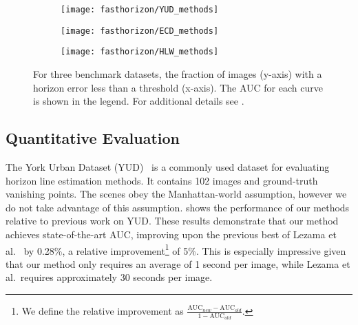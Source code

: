 \begin{figure*}[]
  \centering
  \begin{subfigure}{.30\linewidth}
    \centering
    \texttt{[image: fasthorizon/YUD\_methods]}
    \label{fig:horError_YUD}
  \end{subfigure}
  \hfill
  \begin{subfigure}{.3\linewidth}
    \centering
    \texttt{[image: fasthorizon/ECD\_methods]}
    \label{fig:horError_ECD}
  \end{subfigure}
  \hfill
  \begin{subfigure}{.3\linewidth}
    \centering
    \texttt{[image: fasthorizon/HLW\_methods]}
    \label{fig:hlw_err}
  \end{subfigure}
  \caption{For three benchmark datasets, the fraction of images
    (y-axis) with a horizon error less than a threshold (x-axis). The
    AUC for each curve is shown in the legend. For additional details
see .}
  \label{fig:horError}
\end{figure*}

\subsection{Quantitative Evaluation}


The York Urban Dataset (YUD)~\cite{edgebased2008} is a commonly used dataset
for evaluating horizon line estimation methods. It contains 102 images
and ground-truth vanishing points. The scenes obey the Manhattan-world
assumption, however we do not take advantage of this assumption.
 shows the performance of our methods relative to
previous work on YUD. These results demonstrate that our method
achieves state-of-the-art AUC, improving upon the previous best of
Lezama et al.~\cite{alignment2014} by 0.28\%, a relative
improvement\footnote{We define the relative improvement as
$\frac{\text{AUC}_{new} - \text{AUC}_{old}}{1 - \text{AUC}_{old}}$.} of
5\%. This is especially impressive given that our method only requires
an average of 1 second per image, while Lezama et al.\ requires
approximately 30 seconds per image.

